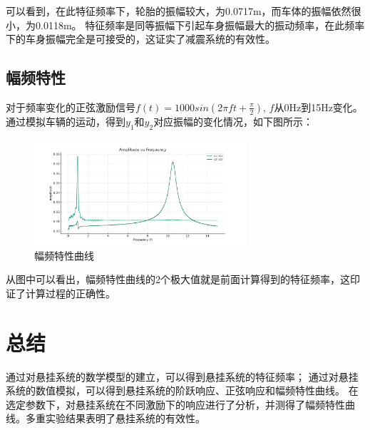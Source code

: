 \documentclass[UTF8, a4paper]{ctexart}
\begin{document}
可以看到，在此特征频率下，轮胎的振幅较大，为0.0717m，而车体的振幅依然很小，为0.0118m。
特征频率是同等振幅下引起车身振幅最大的振动频率，在此频率下的车身振幅完全是可接受的，这证实了减震系统的有效性。

\subsection{幅频特性}
对于频率变化的正弦激励信号$f(t)=1000sin(2\pi f t+\frac{\pi}{2})$, $f$从0Hz到15Hz变化。
通过模拟车辆的运动，得到$y_1$和$y_2$对应振幅的变化情况，如下图所示：

\begin{figure}[h]
    \centering
    \includegraphics[width=0.7\textwidth]{../fig/amplitude_vs_frequency.png}
    \caption{幅频特性曲线}
    \label{fig:amplitude_frequency}
\end{figure}

从图中可以看出，幅频特性曲线的2个极大值就是前面计算得到的特征频率，这印证了计算过程的正确性。

\section{总结}
通过对悬挂系统的数学模型的建立，可以得到悬挂系统的特征频率；
通过对悬挂系统的数值模拟，可以得到悬挂系统的阶跃响应、正弦响应和幅频特性曲线。
在选定参数下，对悬挂系统在不同激励下的响应进行了分析，并测得了幅频特性曲线。多重实验结果表明了悬挂系统的有效性。
\end{document}
